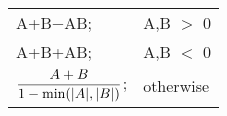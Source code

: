 \begin{tabular}{ll}
A+B$-$AB; & A,B $>$ 0 \\
A+B+AB;   & A,B $<$ 0 \\
$\dfrac {A + B} {1 - \textup{min}( \lvert A \rvert, \lvert B \rvert )}$; & otherwise \\
\end{tabular}
